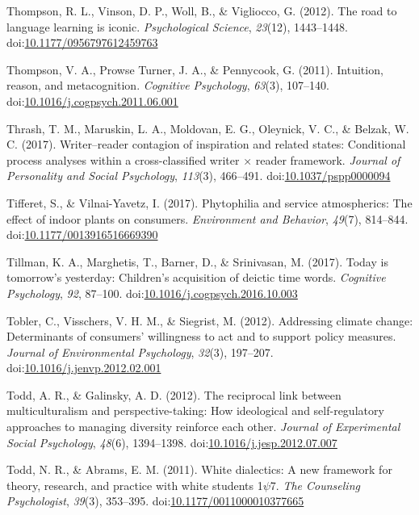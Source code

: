 \documentclass[english,man]{apa6}
\theoremstyle{definition}
\theoremstyle{definition}
\theoremstyle{definition}
\theoremstyle{remark}
\begin{document}
\hypertarget{ref-Thompson2012}{}
Thompson, R. L., Vinson, D. P., Woll, B., \& Vigliocco, G. (2012). The
road to language learning is iconic. \emph{Psychological Science},
\emph{23}(12), 1443--1448.
doi:\href{https://doi.org/10.1177/0956797612459763}{10.1177/0956797612459763}

\hypertarget{ref-Thompson2011a}{}
Thompson, V. A., Prowse Turner, J. A., \& Pennycook, G. (2011).
Intuition, reason, and metacognition. \emph{Cognitive Psychology},
\emph{63}(3), 107--140.
doi:\href{https://doi.org/10.1016/j.cogpsych.2011.06.001}{10.1016/j.cogpsych.2011.06.001}

\hypertarget{ref-Thrash2017}{}
Thrash, T. M., Maruskin, L. A., Moldovan, E. G., Oleynick, V. C., \&
Belzak, W. C. (2017). Writer--reader contagion of inspiration and
related states: Conditional process analyses within a cross-classified
writer × reader framework. \emph{Journal of Personality and Social
Psychology}, \emph{113}(3), 466--491.
doi:\href{https://doi.org/10.1037/pspp0000094}{10.1037/pspp0000094}

\hypertarget{ref-Tifferet2017}{}
Tifferet, S., \& Vilnai-Yavetz, I. (2017). Phytophilia and service
atmospherics: The effect of indoor plants on consumers.
\emph{Environment and Behavior}, \emph{49}(7), 814--844.
doi:\href{https://doi.org/10.1177/0013916516669390}{10.1177/0013916516669390}

\hypertarget{ref-Tillman2017}{}
Tillman, K. A., Marghetis, T., Barner, D., \& Srinivasan, M. (2017).
Today is tomorrow's yesterday: Children's acquisition of deictic time
words. \emph{Cognitive Psychology}, \emph{92}, 87--100.
doi:\href{https://doi.org/10.1016/j.cogpsych.2016.10.003}{10.1016/j.cogpsych.2016.10.003}

\hypertarget{ref-Tobler2012}{}
Tobler, C., Visschers, V. H. M., \& Siegrist, M. (2012). Addressing
climate change: Determinants of consumers' willingness to act and to
support policy measures. \emph{Journal of Environmental Psychology},
\emph{32}(3), 197--207.
doi:\href{https://doi.org/10.1016/j.jenvp.2012.02.001}{10.1016/j.jenvp.2012.02.001}

\hypertarget{ref-Todd2012}{}
Todd, A. R., \& Galinsky, A. D. (2012). The reciprocal link between
multiculturalism and perspective-taking: How ideological and
self-regulatory approaches to managing diversity reinforce each other.
\emph{Journal of Experimental Social Psychology}, \emph{48}(6),
1394--1398.
doi:\href{https://doi.org/10.1016/j.jesp.2012.07.007}{10.1016/j.jesp.2012.07.007}

\hypertarget{ref-Todd2011a}{}
Todd, N. R., \& Abrams, E. M. (2011). White dialectics: A new framework
for theory, research, and practice with white students 1\(\psi\)7.
\emph{The Counseling Psychologist}, \emph{39}(3), 353--395.
doi:\href{https://doi.org/10.1177/0011000010377665}{10.1177/0011000010377665}
\end{document}
